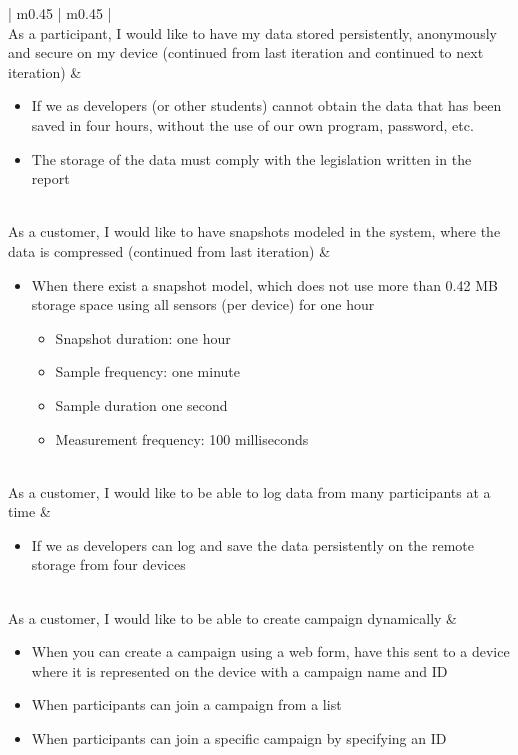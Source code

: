 \begin{center}
\begin{longtable}{| m{} | m{} |}
	 \\ \hline
	As a participant, I would like to have my data stored persistently, anonymously and secure on my device (continued from last iteration and continued to next iteration) & 
	\begin{itemize}[noitemsep,topsep=0pt,parsep=0pt,partopsep=0pt]
		\item If we as developers (or other students) cannot obtain the data that has been saved in four hours, without the use of our own program, password, etc.
		\item The storage of the data must comply with the legislation written in the report
	\end{itemize} \\ \hline
	As a customer, I would like to have snapshots modeled in the system, where the data is compressed (continued from last iteration) & 
	\begin{itemize}[noitemsep,topsep=0pt,parsep=0pt,partopsep=0pt]
	 	\item When there exist a snapshot model, which does not use more than 0.42 MB storage space using all sensors (per device) for one hour
			\begin{itemize}[noitemsep,topsep=0pt,parsep=0pt,partopsep=0pt]
				\item Snapshot duration: one hour
				\item Sample frequency: one minute
				\item Sample duration one second
				\item Measurement frequency: 100 milliseconds
			\end{itemize}
	 \end{itemize} \\ \hline
	As a customer, I would like to be able to log data from many participants at a time & 
	\begin{itemize}[noitemsep,topsep=0pt,parsep=0pt,partopsep=0pt]
		\item If we as developers can log and save the data persistently on the remote storage from four devices
	\end{itemize} \\ \hline
	As a customer, I would like to be able to create campaign dynamically & 
	\begin{itemize}[noitemsep,topsep=0pt,parsep=0pt,partopsep=0pt]
		\item When you can create a campaign using a web form, have this sent to a device where it is represented on the device with a campaign name and ID
		\item When participants can join a campaign from a list
		\item When participants can join a specific campaign by specifying an ID
	\end{itemize} \\ \hline


\end{longtable}
\end{center}
